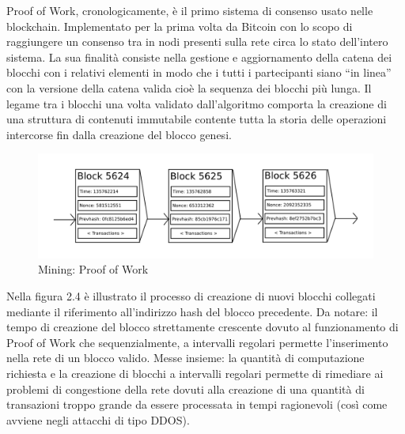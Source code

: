 Proof of Work, cronologicamente, è il primo sistema di consenso usato nelle blockchain. Implementato per la prima volta da Bitcoin con lo scopo di raggiungere un consenso tra in nodi presenti sulla rete circa lo stato dell’intero sistema. La sua finalità consiste nella gestione e aggiornamento della catena dei blocchi con i relativi elementi in modo che i tutti i partecipanti siano “in linea” con la versione della catena valida cioè la sequenza dei blocchi più lunga. Il legame tra i blocchi una volta validato dall'algoritmo comporta la creazione di una struttura di contenuti immutabile contente tutta la storia delle operazioni intercorse fin dalla creazione del blocco genesi.
\begin{figure}[H]
\centering
\includegraphics[width=1\textwidth]{immagini/mining_pow.png}
\caption{Mining: Proof of Work}
\label{fig:mesh4}
\end{figure}

Nella figura 2.4 è illustrato il processo di creazione di nuovi blocchi collegati mediante il riferimento all'indirizzo hash del blocco precedente. Da notare: il tempo di creazione del blocco strettamente crescente dovuto al funzionamento di Proof of Work che sequenzialmente, a intervalli regolari permette l'inserimento nella rete di un blocco valido. Messe insieme: la quantità di computazione richiesta e la creazione di blocchi a intervalli regolari permette di rimediare ai problemi di congestione della rete dovuti alla creazione di una quantità di transazioni troppo grande da essere processata in tempi ragionevoli (così come avviene negli attacchi di tipo DDOS).

